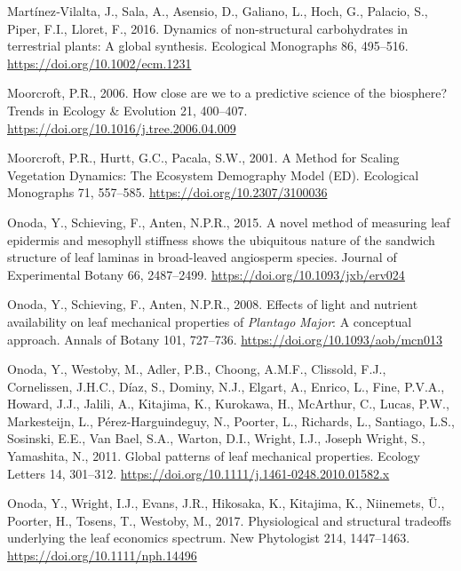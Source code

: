 \documentclass[
  12pt,
  letterpaper,
  DIV=11,
  numbers=noendperiod]{scrartcl}
\newlength{\cslhangindent}
\newenvironment{CSLReferences}[2] %
 {\begin{list}{}{%
  \setlength{\itemindent}{0pt}
  \setlength{\leftmargin}{0pt}
  \setlength{\parsep}{0pt}
  \ifodd #1
   \setlength{\leftmargin}{\cslhangindent}
   \setlength{\itemindent}{-1\cslhangindent}
  \fi
  \setlength{\itemsep}{#2\baselineskip}}}
 {\end{list}}
\begin{document}
\begin{CSLReferences}{1}{0}
Martínez‐Vilalta, J., Sala, A., Asensio, D., Galiano, L., Hoch, G.,
Palacio, S., Piper, F.I., Lloret, F., 2016. Dynamics of non-structural
carbohydrates in terrestrial plants: A global synthesis. Ecological
Monographs 86, 495--516. \url{https://doi.org/10.1002/ecm.1231}

Moorcroft, P.R., 2006. How close are we to a predictive science of the
biosphere? Trends in Ecology \& Evolution 21, 400--407.
\url{https://doi.org/10.1016/j.tree.2006.04.009}

Moorcroft, P.R., Hurtt, G.C., Pacala, S.W., 2001. A {Method} for
{Scaling Vegetation Dynamics}: {The Ecosystem Demography Model} ({ED}).
Ecological Monographs 71, 557--585.
\url{https://doi.org/10.2307/3100036}

Onoda, Y., Schieving, F., Anten, N.P.R., 2015. A novel method of
measuring leaf epidermis and mesophyll stiffness shows the ubiquitous
nature of the sandwich structure of leaf laminas in broad-leaved
angiosperm species. Journal of Experimental Botany 66, 2487--2499.
\url{https://doi.org/10.1093/jxb/erv024}

Onoda, Y., Schieving, F., Anten, N.P.R., 2008. Effects of light and
nutrient availability on leaf mechanical properties of
{\emph{Plantago}}{ \emph{Major}}: {A} conceptual approach. Annals of
Botany 101, 727--736. \url{https://doi.org/10.1093/aob/mcn013}

Onoda, Y., Westoby, M., Adler, P.B., Choong, A.M.F., Clissold, F.J.,
Cornelissen, J.H.C., Díaz, S., Dominy, N.J., Elgart, A., Enrico, L.,
Fine, P.V.A., Howard, J.J., Jalili, A., Kitajima, K., Kurokawa, H.,
McArthur, C., Lucas, P.W., Markesteijn, L., Pérez-Harguindeguy, N.,
Poorter, L., Richards, L., Santiago, L.S., Sosinski, E.E., Van Bael,
S.A., Warton, D.I., Wright, I.J., Joseph Wright, S., Yamashita, N.,
2011. Global patterns of leaf mechanical properties. Ecology Letters 14,
301--312. \url{https://doi.org/10.1111/j.1461-0248.2010.01582.x}

Onoda, Y., Wright, I.J., Evans, J.R., Hikosaka, K., Kitajima, K.,
Niinemets, Ü., Poorter, H., Tosens, T., Westoby, M., 2017. Physiological
and structural tradeoffs underlying the leaf economics spectrum. New
Phytologist 214, 1447--1463. \url{https://doi.org/10.1111/nph.14496}


\end{CSLReferences}
\end{document}
